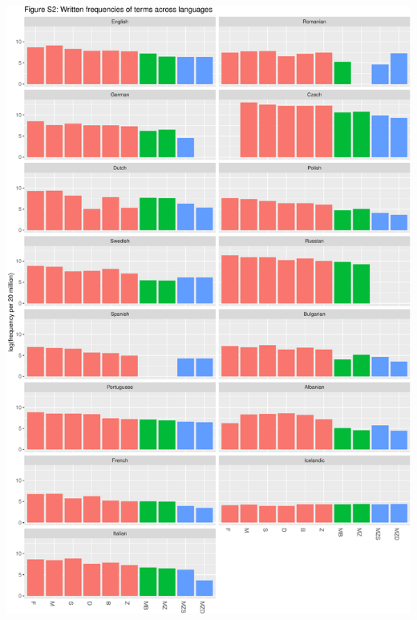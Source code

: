 \documentclass[]{article}
\begin{document}
\begin{center}\includegraphics{figures/unnamed-chunk-6-2} \end{center}
\end{document}
